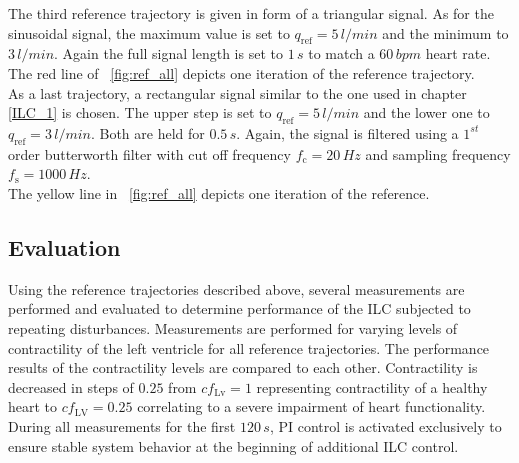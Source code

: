 \newpage
The third reference trajectory is given in form of a triangular signal. As for the sinusoidal signal, the maximum value is set to $q_{\mathrm{ref}}=5\,l/min$ and the minimum to $3\, l/min$. Again the full signal length is set to $1\,s$ to match a $60\,bpm$ heart rate. The red line of \figurename~\ref{fig:ref_all} depicts one iteration of the reference trajectory.
\\As a last trajectory, a rectangular signal similar to the one used in chapter \ref{ILC_1} is chosen. The upper step is set to $q_{\mathrm{ref}}=5\,l/min$ and the lower one to $q_{\mathrm{ref}}=3\,l/min$. Both are held for $0.5\,s$. Again, the signal is filtered using a $1^{st}$ order butterworth filter with cut off frequency $f_{\mathrm{c}}=20\,Hz$ and sampling frequency $f_{\mathrm{s}}=1000\,Hz$.
\\The yellow line in \figurename~\ref{fig:ref_all} depicts one iteration of the reference.
%


\subsection{Evaluation}
Using the reference trajectories described above, several measurements are performed and evaluated to determine performance of the ILC subjected to repeating disturbances. Measurements are performed for varying levels of contractility of the left ventricle for all reference trajectories. The performance results of the contractility levels are compared to each other. Contractility is decreased in steps of $0.25$ from $cf_{\mathrm{Lv}}=1$ representing contractility of a healthy heart to $cf_{\mathrm{LV}}=0.25$ correlating to a severe impairment of heart functionality.
\\During all measurements for the first $120\,s$, PI control is activated exclusively to ensure stable system behavior at the beginning of additional ILC control.

